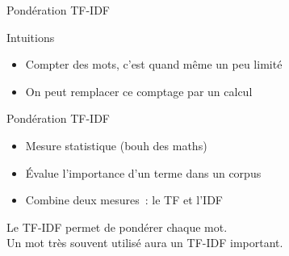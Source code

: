 \documentclass[serif, aspectratio=169]{beamer}
\begin{document}
\begin{frame}{Pondération TF-IDF}
    \begin{block}{Intuitions}
        \begin{itemize}
            \item Compter des mots, c'est quand même un peu limité
            \item On peut remplacer ce comptage par un calcul
        \end{itemize}
    \end{block}
    \vfill
    \begin{block}{Pondération TF-IDF}
        \begin{itemize}
            \item Mesure statistique (bouh des maths)
            \item Évalue l'importance d'un terme dans un corpus
            \item Combine deux mesures~: le TF et l'IDF
        \end{itemize}
    \end{block}
    \vfill
    \begin{center}
        \Large
        Le TF-IDF permet de pondérer chaque mot. \\
        Un mot très souvent utilisé aura un TF-IDF important.
    \end{center}
\end{frame}
\end{document}
